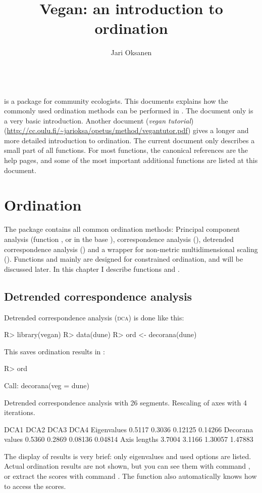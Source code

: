 \documentclass[article,nojss]{jss}
\title{Vegan: an introduction to ordination}
\author{Jari Oksanen}
\begin{document}


\tableofcontents

~\\[2ex]
\noindent {} is a package for community ecologists.  This
documents explains how the commonly used ordination methods can be
performed in .  The document only is a very basic
introduction.  Another document (\emph{vegan tutorial})
(\url{http://cc.oulu.fi/~jarioksa/opetus/method/vegantutor.pdf}) gives
a longer and more detailed introduction to ordination.  The
current document only describes a small part of all 
functions.  For most functions, the canonical references are the
 help pages, and some of the most important additional
functions are listed at this document.

\section{Ordination}

The  package contains all common ordination methods:
Principal component analysis (function , or  in
the base ), correspondence analysis (),
detrended correspondence analysis () and a wrapper for
non-metric multidimensional scaling ().  Functions
 and  mainly are designed for constrained
ordination, and will be discussed later.  In this chapter I describe
functions  and .

\subsection{Detrended correspondence analysis}


Detrended correspondence analysis (\textsc{dca}) is done like this:
\begin{Schunk}
\begin{Sinput}
R> library(vegan)
R> data(dune)
R> ord <- decorana(dune)
\end{Sinput}
\end{Schunk}
This saves ordination results in :
\begin{Schunk}
\begin{Sinput}
R> ord
\end{Sinput}
\begin{Soutput}
Call:
decorana(veg = dune) 

Detrended correspondence analysis with 26 segments.
Rescaling of axes with 4 iterations.

                  DCA1   DCA2    DCA3    DCA4
Eigenvalues     0.5117 0.3036 0.12125 0.14266
Decorana values 0.5360 0.2869 0.08136 0.04814
Axis lengths    3.7004 3.1166 1.30057 1.47883
\end{Soutput}
\end{Schunk}
The display of results is very brief: only eigenvalues and used
options are listed.  Actual ordination results are not shown, but you
can see them with command , or extract the scores
with command .  The  function also
automatically knows how to access the scores.
\end{document}
